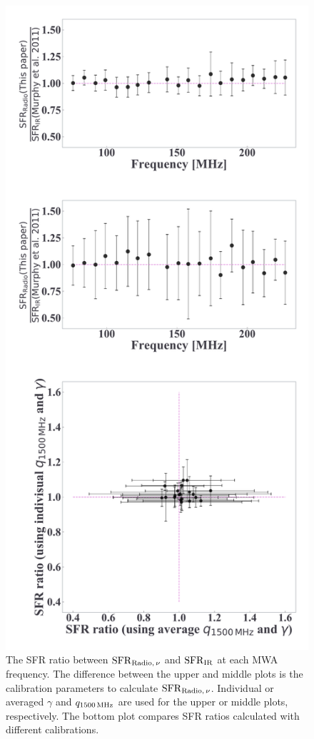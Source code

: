 \begin{figure}[htbp]
	\centering
	\includegraphics[width=.6\linewidth]{Chapter_5/Figures/Result_sfrratio.pdf}
    \caption[The consistency of the radio SFR]{\label{fig:sfrratio}
        The SFR ratio between $\mathrm{SFR}_{\mathrm{Radio},\,\nu}$ and $\mathrm{SFR}_{\mathrm{IR}}$ at each MWA frequency.
        The difference between the upper and middle plots is the calibration parameters to calculate $\mathrm{SFR}_{\mathrm{Radio},\,\nu}$.
        Individual or averaged $\gamma$ and $q_{\mathrm{1500\,\mathrm{MHz}}}$ are used for the upper or middle plots, respectively.
    The bottom plot compares SFR ratios calculated with different calibrations.
    }
\end{figure}

